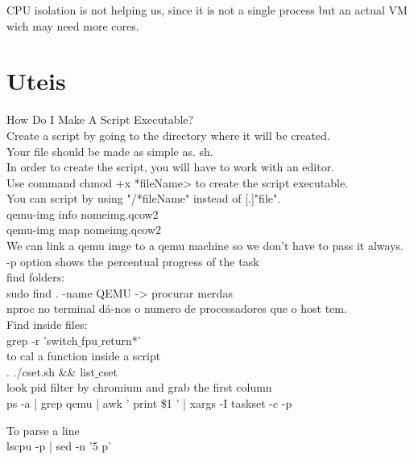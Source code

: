\documentclass[11pt, a4paper, oneside]{article}
\theoremstyle{definition}
\begin{document}
CPU isolation is not helping us, since it is not a single process but an actual VM wich may need more cores. 

\vfill
\pagebreak
\section{Uteis}

How Do I Make A Script Executable?\\
Create a script by going to the directory where it will be created.\\
Your file should be made as simple as. sh.\\
In order to create the script, you will have to work with an editor.\\
Use command chmod +x *fileName> to create the script executable.\\
You can script by using "/*fileName" instead of [.]"file".\\

qemu-img info nomeimg.qcow2\\
qemu-img map nomeimg.qcow2\\

We can link a qemu imge to a qemu machine so we don't have to pass it always. \\

-p option shows the percentual progress of the task\\

find folders:\\
sudo find . -name QEMU -> procurar merdas\\

nproc no terminal dá-nos o numero de processadores que o host tem.\\

Find inside files:\\
grep -r 'switch$\_$fpu$\_$return*'\\


to cal a function inside a script\\
. ./cset.sh \&\& list$\_$cset\\

look pid filter by chromium and grab the first column\\
ps -a | grep qemu | awk '{ print \$1 }' | xargs -I{} taskset -c -p {}

To parse a line\\
lscpu -p | sed -n '5 p'\\
\end{document}
